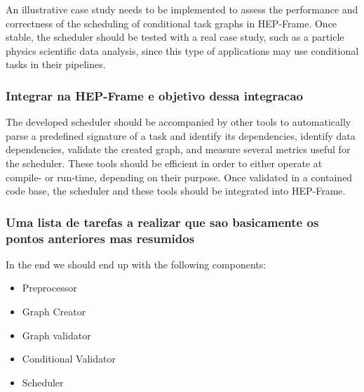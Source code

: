 An illustrative case study needs to be implemented to assess the performance and correctness of the scheduling of conditional task graphs in HEP-Frame. Once stable, the scheduler should be tested with a real case study, such as a particle physics scientific data analysis, since this type of applications may use conditional tasks in their pipelines. 
\subsubsection{Integrar na HEP-Frame e objetivo dessa integracao}

The developed scheduler should be accompanied by other tools to automatically parse a predefined signature of a task and identify its dependencies, identify data dependencies, validate the created graph, and measure several metrics useful for the scheduler. These tools should be efficient in order to either operate at compile- or run-time, depending on their purpose. Once validated in a contained code base, the scheduler and these tools should be integrated into HEP-Frame.
\subsubsection{Uma lista de tarefas a realizar que sao basicamente os pontos anteriores mas resumidos}
In the end we should end up with the following components:
\begin{itemize}
    \item Preprocessor
    \item Graph Creator
    \item Graph validator
    \item Conditional Validator
    \item Scheduler
\end{itemize}
